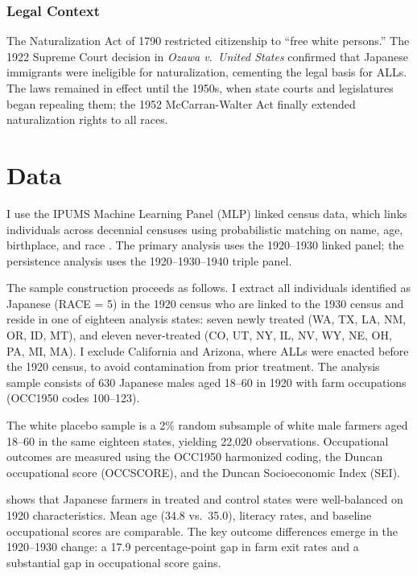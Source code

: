 \documentclass[12pt]{article}
\begin{document}
\subsubsection*{Legal Context} The Naturalization Act of 1790 restricted citizenship to ``free white persons.'' The 1922 Supreme Court decision in \textit{Ozawa v.\ United States} confirmed that Japanese immigrants were ineligible for naturalization, cementing the legal basis for ALLs. The laws remained in effect until the 1950s, when state courts and legislatures began repealing them; the 1952 McCarran-Walter Act finally extended naturalization rights to all races.

\section{Data}

I use the IPUMS Machine Learning Panel (MLP) linked census data, which links individuals across decennial censuses using probabilistic matching on name, age, birthplace, and race \citep{helgertz2023ipums}. The primary analysis uses the 1920--1930 linked panel; the persistence analysis uses the 1920--1930--1940 triple panel.

The sample construction proceeds as follows. I extract all individuals identified as Japanese (RACE = 5) in the 1920 census who are linked to the 1930 census and reside in one of eighteen analysis states: seven newly treated (WA, TX, LA, NM, OR, ID, MT), and eleven never-treated (CO, UT, NY, IL, NV, WY, NE, OH, PA, MI, MA). I exclude California and Arizona, where ALLs were enacted before the 1920 census, to avoid contamination from prior treatment. The analysis sample consists of 630 Japanese males aged 18--60 in 1920 with farm occupations (OCC1950 codes 100--123).

The white placebo sample is a 2\% random subsample of white male farmers aged 18--60 in the same eighteen states, yielding 22,020 observations. Occupational outcomes are measured using the OCC1950 harmonized coding, the Duncan occupational score (OCCSCORE), and the Duncan Socioeconomic Index (SEI).



 shows that Japanese farmers in treated and control states were well-balanced on 1920 characteristics. Mean age (34.8 vs.\ 35.0), literacy rates, and baseline occupational scores are comparable. The key outcome differences emerge in the 1920--1930 change: a 17.9 percentage-point gap in farm exit rates and a substantial gap in occupational score gains.
\end{document}
